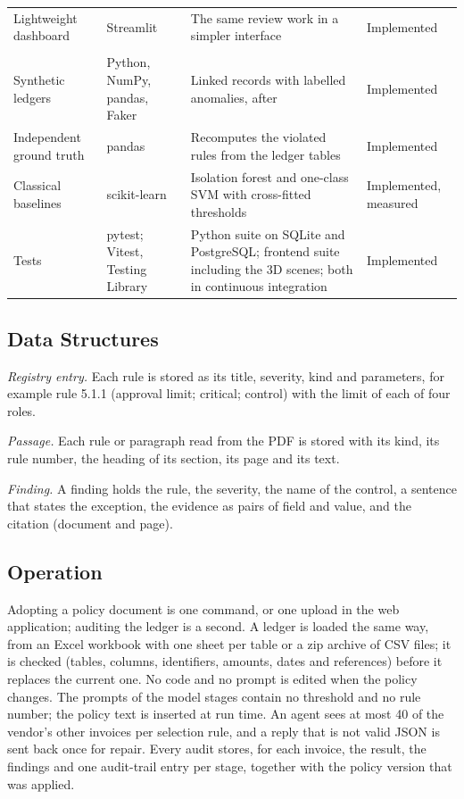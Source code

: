 \documentclass[conference]{IEEEtran}
\begin{document}
\begin{table}[t]
\begin{tabular}{L{3.4cm}L{4.2cm}L{6.2cm}L{2.7cm}}
Lightweight dashboard & Streamlit & The same review work in a simpler interface & Implemented \\
\addlinespace
{} \\
Synthetic ledgers & Python, NumPy, pandas, Faker & Linked records with labelled anomalies, after~\cite{wang2025auditbench} & Implemented \\
Independent ground truth & pandas & Recomputes the violated rules from the ledger tables & Implemented \\
Classical baselines & scikit-learn~\cite{pedregosa2011} & Isolation forest and one-class SVM with cross-fitted thresholds & Implemented, measured \\
Tests & pytest; Vitest, Testing Library & Python suite on SQLite and PostgreSQL; frontend suite including the 3D scenes; both in continuous integration & Implemented \\
\bottomrule
\end{tabular}
\end{table}

\subsection{Data Structures}
\textit{Registry entry.} Each rule is stored as its title, severity, kind and parameters, for example rule 5.1.1 (approval limit; critical; control) with the limit of each of four roles.

\textit{Passage.} Each rule or paragraph read from the PDF is stored with its kind, its rule number, the heading of its section, its page and its text.

\textit{Finding.} A finding holds the rule, the severity, the name of the control, a sentence that states the exception, the evidence as pairs of field and value, and the citation (document and page).

\subsection{Operation}
Adopting a policy document is one command, or one upload in the web application; auditing the ledger is a second. A ledger is loaded the same way, from an Excel workbook with one sheet per table or a zip archive of CSV files; it is checked (tables, columns, identifiers, amounts, dates and references) before it replaces the current one. No code and no prompt is edited when the policy changes. The prompts of the model stages contain no threshold and no rule number; the policy text is inserted at run time. An agent sees at most 40 of the vendor's other invoices per selection rule, and a reply that is not valid JSON is sent back once for repair. Every audit stores, for each invoice, the result, the findings and one audit-trail entry per stage, together with the policy version that was applied.
\end{document}
